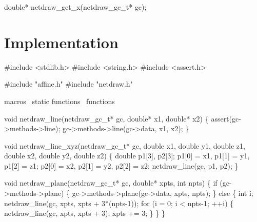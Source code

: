 \nwenddocs{}\plusendmoddef
double* netdraw_get_x(netdraw_gc_t* gc);
\nwendcode{}\nwdocspar


\section{Implementation}

\nwenddocs{}\endmoddef
#include <stdlib.h>
#include <string.h>
#include <assert.h>

#include "affine.h"
#include "netdraw.h"

\LA{}macros~{\nwtagstyle{}}\RA{}
\LA{}static functions~{\nwtagstyle{}}\RA{}
\LA{}functions~{\nwtagstyle{}}\RA{}
\nwendcode{}\nwdocspar

\nwenddocs{}\endmoddef
void netdraw_line(netdraw_gc_t* gc, double* x1, double* x2)
\{
    assert(gc->methods->line);
    gc->methods->line(gc->data, x1, x2);
\}

void netdraw_line_xyz(netdraw_gc_t* gc,
                      double x1, double y1, double z1,
                      double x2, double y2, double z2)
\{
    double p1[3], p2[3];
    p1[0] = x1, p1[1] = y1, p1[2] = z1;
    p2[0] = x2, p2[1] = y2, p2[2] = z2;
    netdraw_line(gc, p1, p2);
\}

\nwendcode{}\nwdocspar

\nwenddocs{}\plusendmoddef
void netdraw_plane(netdraw_gc_t* gc, double* xpts, int npts)
\{
    if (gc->methods->plane) \{
        gc->methods->plane(gc->data, xpts, npts);
    \} else \{
        int i;
        netdraw_line(gc, xpts, xpts + 3*(npts-1));
        for (i = 0; i < npts-1; ++i) \{
            netdraw_line(gc, xpts, xpts + 3);
            xpts += 3;
        \}
    \}
\}

